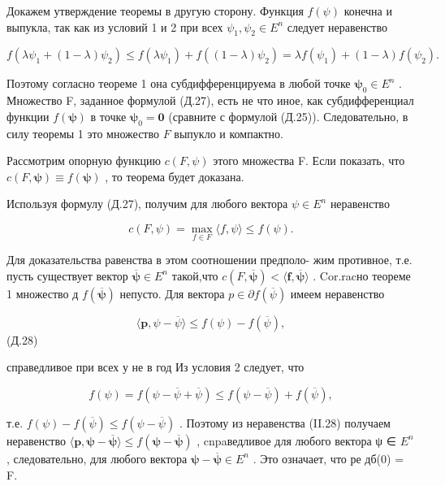 \documentclass[8pt]{extarticle}
\begin{document}
Докажем утверждение теоремы в другую сторону. Функция \(f\left( \psi \right)\) конечна и выпукла, так как из условий 1 и 2 при всех \({\psi }_{1},{\psi }_{2} \in  {E}^{n}\) следует неравенство

\[
f\left( {\lambda {\psi }_{1} + \left( {1 - \lambda }\right) {\psi }_{2}}\right)  \leq  f\left( {\lambda {\psi }_{1}}\right)  + f\left( {\left( {1 - \lambda }\right) {\psi }_{2}}\right)  = {\lambda f}\left( {\psi }_{1}\right)  + \left( {1 - \lambda }\right) f\left( {\psi }_{2}\right) .
\]

Поэтому согласно теореме 1 она субдифференцируема в любой точке \({\mathbf{\psi }}_{0} \in  {E}^{n}\) . Множество F, заданное формулой (Д.27), есть не что иное, как субдифференциал функции \(f\left( \mathbf{\psi }\right)\) в точке \({\mathbf{\psi }}_{0} = \mathbf{0}\) (сравните с формулой (Д.25)). Следовательно, в силу теоремы 1 это множество \(F\) выпукло и компактно.

Рассмотрим опорную функцию \(c\left( {F,\psi }\right)\) этого множества F. Если показать, что \(c\left( {F,\mathbf{\psi }}\right)  \equiv  f\left( \mathbf{\psi }\right)\) , то теорема будет доказана.

Используя формулу (Д.27), получим для любого вектора \(\psi  \in  {E}^{n}\) неравенство

\[
c\left( {F,\psi }\right)  = \mathop{\max }\limits_{{f \in  F}}\langle f,\psi \rangle  \leq  f\left( \psi \right) .
\]

Для доказательства равенства в этом соотношении предполо- жим противное, т.е. пусть существует вектор \(\overline{\mathbf{\psi }} \in  {E}^{n}\) такой,что \(c\left( {F,\overline{\mathbf{\psi }}}\right)  < \langle \mathbf{f},\overline{\mathbf{\psi }}\rangle\) . Cor.racно теореме 1 множество д \(f\left( \overline{\mathbf{\psi }}\right)\) непусто. Для вектора \(p \in  \partial f\left( \overline{\psi }\right)\) имеем неравенство

\[
\langle \mathbf{p},\psi  - \overline{\psi }\rangle  \leq  f\left( \psi \right)  - f\left( \overline{\psi }\right) ,
\]
 (Д.28)

справедливое при всех у не в год Из условия 2 следует, что

\[
f\left( \psi \right)  = f\left( {\psi  - \overline{\psi } + \overline{\psi }}\right)  \leq  f\left( {\psi  - \overline{\psi }}\right)  + f\left( \overline{\psi }\right) ,
\]

т.е. \(f\left( \psi \right)  - f\left( \overline{\psi }\right)  \leq  f\left( {\psi  - \overline{\psi }}\right)\) . Поэтому из неравенства (II.28) получаем неравенство \(\langle \mathbf{p},\mathbf{\psi } - \overline{\mathbf{\psi }}\rangle  \leq  f\left( {\mathbf{\psi } - \overline{\mathbf{\psi }}}\right)\) , cnpaведливое для любого вектора ψ ∈ \({E}^{n}\) , следовательно, для любого вектора \(\mathbf{\psi } - \overline{\mathbf{\psi }} \in  {E}^{n}\) . Это означает, что ре дб(0) = F.
\end{document}
